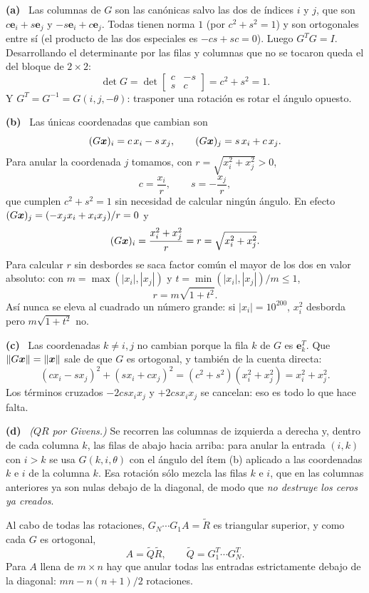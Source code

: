 \documentclass[11pt,a4paper]{article}
\newcommand{\bi}[1]{\boldsymbol{#1}}
\newcommand{\itemsol}[1]{\par\medskip\noindent\textbf{(#1)}\ \ignorespaces}
\begin{document}
\itemsol{a} Las columnas de $G$ son las canónicas salvo las dos de índices $i$ y
$j$, que son $c\bi{e}_i+s\bi{e}_j$ y $-s\bi{e}_i+c\bi{e}_j$. Todas tienen norma
$1$ (por $c^2+s^2=1$) y son ortogonales entre sí (el producto de las dos
especiales es $-cs+sc=0$). Luego $G^TG=I$. Desarrollando el determinante por las
filas y columnas que no se tocaron queda el del bloque de $2\times2$:
\[
\det G=\det\begin{bmatrix}c&-s\\ s&c\end{bmatrix}=c^2+s^2=1 .
\]
Y $G^T=G^{-1}=G(i,j,-\theta)$: trasponer una rotación es rotar el ángulo
opuesto.

\itemsol{b} Las únicas coordenadas que cambian son
\[
(G\bx)_i=c\,x_i-s\,x_j,\qquad (G\bx)_j=s\,x_i+c\,x_j .
\]
Para anular la coordenada $j$ tomamos, con $r=\sqrt{x_i^2+x_j^2}>0$,
\[
c=\frac{x_i}{r},\qquad s=-\frac{x_j}{r},
\]
que cumplen $c^2+s^2=1$ sin necesidad de calcular ningún ángulo. En efecto
$(G\bx)_j=(-x_jx_i+x_ix_j)/r=0$ y
\[
(G\bx)_i=\frac{x_i^2+x_j^2}{r}=r=\sqrt{x_i^2+x_j^2}.
\]
Para calcular $r$ sin desbordes se saca factor común el mayor de los dos en
valor absoluto: con $m=\max(|x_i|,|x_j|)$ y $t=\min(|x_i|,|x_j|)/m\le1$,
\[
r=m\sqrt{1+t^2}.
\]
Así nunca se eleva al cuadrado un número grande: si $|x_i|=10^{200}$, $x_i^2$
desborda pero $m\sqrt{1+t^2}$ no.

\itemsol{c} Las coordenadas $k\neq i,j$ no cambian porque la fila $k$ de $G$ es
$\bi{e}_k^T$. Que $\|G\bx\|=\|\bx\|$ sale de que $G$ es ortogonal, y también de
la cuenta directa:
\[
(cx_i-sx_j)^2+(sx_i+cx_j)^2=(c^2+s^2)(x_i^2+x_j^2)=x_i^2+x_j^2 .
\]
Los términos cruzados $-2csx_ix_j$ y $+2csx_ix_j$ se cancelan: eso es todo lo
que hace falta.

\itemsol{d} \emph{($QR$ por Givens.)} Se recorren las columnas de izquierda a
derecha y, dentro de cada columna $k$, las filas de abajo hacia arriba: para
anular la entrada $(i,k)$ con $i>k$ se usa $G(k,i,\theta)$ con el ángulo del
ítem (b) aplicado a las coordenadas $k$ e $i$ de la columna $k$. Esa rotación
sólo mezcla las filas $k$ e $i$, que en las columnas anteriores ya son nulas
debajo de la diagonal, de modo que \emph{no destruye los ceros ya creados}.

Al cabo de todas las rotaciones, $G_N\cdots G_1A=\widetilde R$ es triangular
superior, y como cada $G$ es ortogonal,
\[
A=\widetilde Q\widetilde R,\qquad \widetilde Q=G_1^T\cdots G_N^T .
\]
Para $A$ llena de $m\times n$ hay que anular todas las entradas estrictamente
debajo de la diagonal: $mn-n(n+1)/2$ rotaciones.
\end{document}
